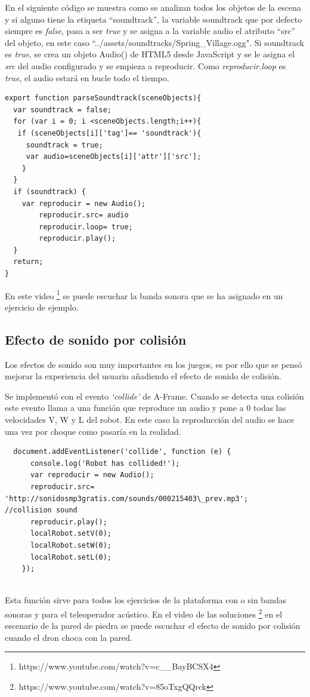 En el siguiente código se muestra como se analizan todos los objetos de la escena y si alguno tiene la etiqueta ``soundtrack'', la variable soundtrack  que por defecto siempre es \textit{false}, pasa a ser \textit{true} y se asigna a la variable audio el atributo  ``src'' del objeto, en este caso ``../assets/soundtracks/Spring\_Village.ogg".  
Si soundtrack es \textit{true}, se crea un objeto Audio() de HTML5 desde JavaScript y se le asigna el \textit{src} del audio configurado y se empieza a reproducir. Como \textit{reproducir.loop} es \textit{true}, el audio estará en bucle todo el tiempo.

\begin{lstlisting}
export function parseSoundtrack(sceneObjects){
  var soundtrack = false;
  for (var i = 0; i <sceneObjects.length;i++){
   if (sceneObjects[i]['tag']== 'soundtrack'){
     soundtrack = true;
     var audio=sceneObjects[i]['attr']['src'];
    }
  }
  if (soundtrack) {
    var reproducir = new Audio();
        reproducir.src= audio
        reproducir.loop= true;
        reproducir.play();
  }
  return;
}
\end{lstlisting}

En este video \footnote{https://www.youtube.com/watch?v=c\_\_BayBCSX4} se puede escuchar la banda sonora que se ha asignado en un ejercicio de ejemplo.

\subsection{Efecto de sonido por colisión }

Los efectos de sonido son muy importantes en los juegos, es por ello que se pensó mejorar la experiencia del usuario añadiendo el efecto de sonido de colisión. 

Se implementó con el evento \textit{`collide'} de A-Frame. Cuando se detecta una colisión este evento llama a una función que reproduce un audio y pone a 0 todas las velocidades V, W y L del robot.  En este caso la reproducción del audio se hace una vez por choque como pasaría en la realidad.

\begin{lstlisting}
  document.addEventListener('collide', function (e) {
      console.log('Robot has collided!');
      var reproducir = new Audio();
      reproducir.src= 'http://sonidosmp3gratis.com/sounds/000215403\_prev.mp3';   //collision sound
      reproducir.play();
      localRobot.setV(0);
      localRobot.setW(0);
      localRobot.setL(0);
	});
	
\end{lstlisting}

Esta función sirve para todos los ejercicios de la plataforma con o sin  bandas sonoras y para el teleoperador acústico. En el video de las soluciones  \footnote{https://www.youtube.com/watch?v=85oTxgQQrck}  en el escenario de la pared de piedra se puede escuchar el efecto de sonido por colisión cuando el dron choca con la pared.